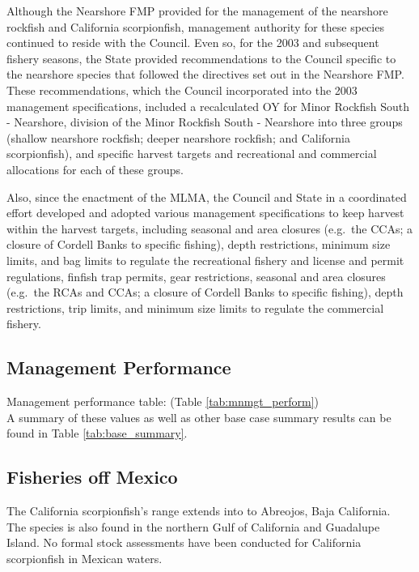 \documentclass[12pt,]{article}
\begin{document}
Although the Nearshore FMP provided for the management of the nearshore
rockfish and California scorpionfish, management authority for these
species continued to reside with the Council. Even so, for the 2003 and
subsequent fishery seasons, the State provided recommendations to the
Council specific to the nearshore species that followed the directives
set out in the Nearshore FMP. These recommendations, which the Council
incorporated into the 2003 management specifications, included a
recalculated OY for Minor Rockfish South - Nearshore, division of the
Minor Rockfish South - Nearshore into three groups (shallow nearshore
rockfish; deeper nearshore rockfish; and California scorpionfish), and
specific harvest targets and recreational and commercial allocations for
each of these groups.

Also, since the enactment of the MLMA, the Council and State in a
coordinated effort developed and adopted various management
specifications to keep harvest within the harvest targets, including
seasonal and area closures (e.g.~the CCAs; a closure of Cordell Banks to
specific fishing), depth restrictions, minimum size limits, and bag
limits to regulate the recreational fishery and license and permit
regulations, finfish trap permits, gear restrictions, seasonal and area
closures (e.g.~the RCAs and CCAs; a closure of Cordell Banks to specific
fishing), depth restrictions, trip limits, and minimum size limits to
regulate the commercial fishery.

\subsection{Management Performance}\label{management-performance-1}

Management performance table: (Table \ref{tab:mnmgt_perform})\\
A summary of these values as well as other base case summary results can
be found in Table \ref{tab:base_summary}.

\subsection{Fisheries off Mexico}\label{fisheries-off-mexico}

The California scorpionfish's range extends into to Abreojos, Baja
California.\\
The species is also found in the northern Gulf of California and
Guadalupe Island. No formal stock assessments have been conducted for
California scorpionfish in Mexican waters.
\end{document}
